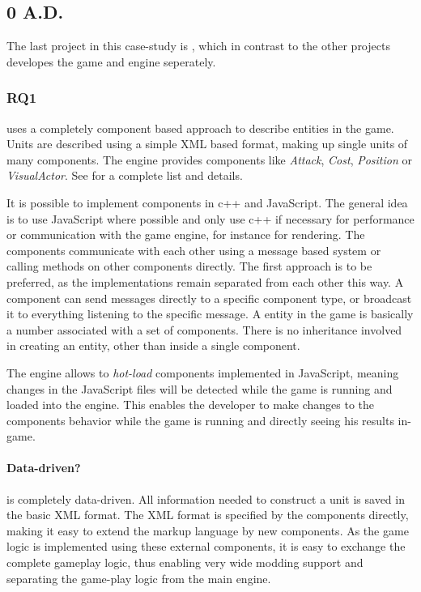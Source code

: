 \subsection{0 A.D.}
The last project in this case-study is \AD{}, which in contrast to the other projects  developes the game and engine
seperately.

\subsubsection{RQ1}
\AD{} uses a completely component based approach to describe entities in the game. Units are described using a simple
XML based format, making up single units of many components. The engine provides components like \textit{Attack},
\textit{Cost}, \textit{Position} or \textit{VisualActor}. See \citet[Entity Component Documenation]{0adcomponents} for a
complete list and details. 

It is possible to implement components in c++ and JavaScript. The general idea is to use
JavaScript where possible and only use c++ if necessary for performance or communication with the game engine, for
instance for rendering. The components communicate with each other using a message based system or calling methods on
other components directly. The first approach is to be preferred, as the implementations remain separated from each other
this way. A component can send messages directly to a specific component type, or broadcast it to everything listening to
the specific message. A entity in the game is basically a number associated with a set of components. There is no
inheritance involved in creating an entity, other than inside a single component.

The engine allows to \textit{hot-load} components implemented in JavaScript, meaning changes in the JavaScript files will
be detected while the game is running and loaded into the engine. This enables the developer to make changes to the
components behavior while the game is running and directly seeing his results in-game.

\paragraph{Data-driven?}
\AD{} is completely data-driven. All information needed to construct a unit is saved in the basic XML format.
The XML format is specified by the components directly, making it easy to extend the markup language by new components.
As the game logic is implemented using these external components, it is easy to exchange the complete gameplay logic,
thus enabling very wide modding support and separating the game-play logic from the main engine.

